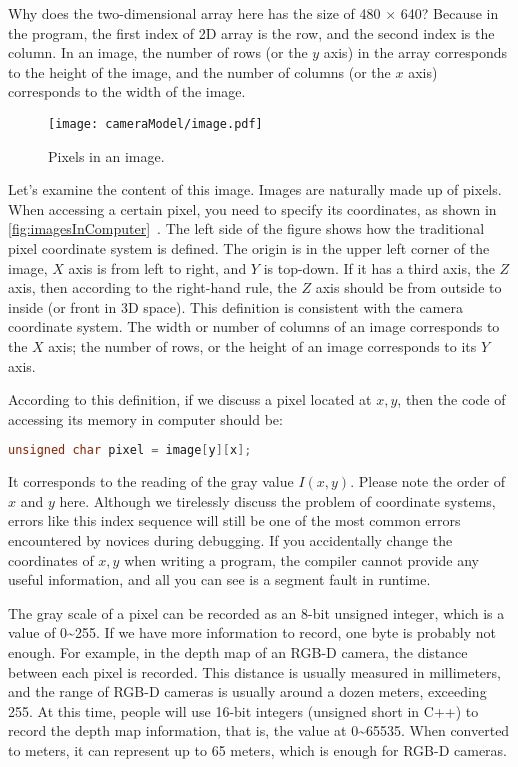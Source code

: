 Why does the two-dimensional array here has the size of 480 $ \times $ 640? Because in the program, the first index of 2D array is the row, and the second index is the column. In an image, the number of rows (or the $y$ axis) in the array corresponds to the height of the image, and the number of columns (or the $x$ axis) corresponds to the width of the image.
\begin{figure}[!t]
    \centering
    \texttt{[image: cameraModel/image.pdf]}
    \caption{Pixels in an image.}
    \label{fig:imagesInComputer}
\end{figure}

Let's examine the content of this image. Images are naturally made up of pixels. When accessing a certain pixel, you need to specify its coordinates, as shown in \autoref{fig:imagesInComputer}~. The left side of the figure shows how the traditional pixel coordinate system is defined. The origin is in the upper left corner of the image, $X$ axis is from left to right, and $Y$ is top-down. If it has a third axis, the $ Z $ axis, then according to the right-hand rule, the $ Z $ axis should be from outside to inside (or front in 3D space). This definition is consistent with the camera coordinate system. The width or number of columns of an image corresponds to the $ X $ axis; the number of rows, or the height of an image corresponds to its $ Y $ axis.

According to this definition, if we discuss a pixel located at $x,y$, then the code of accessing its memory in computer should be:
\begin{lstlisting}[language = C++, caption = Accessing image pixels]
unsigned char pixel = image[y][x];
\end{lstlisting}

It corresponds to the reading of the gray value $ I(x,y) $. Please note the order of $ x $ and $ y $ here. Although we tirelessly discuss the problem of coordinate systems, errors like this index sequence will still be one of the most common errors encountered by novices during debugging. If you accidentally change the coordinates of $ x, y $ when writing a program, the compiler cannot provide any useful information, and all you can see is a segment fault in runtime.

The gray scale of a pixel can be recorded as an 8-bit unsigned integer, which is a value of 0\textasciitilde 255. If we have more information to record, one byte is probably not enough. For example, in the depth map of an RGB-D camera, the distance between each pixel is recorded. This distance is usually measured in millimeters, and the range of RGB-D cameras is usually around a dozen meters, exceeding 255. At this time, people will use 16-bit integers (unsigned short in C++) to record the depth map information, that is, the value at 0\textasciitilde 65535. When converted to meters, it can represent up to 65 meters, which is enough for RGB-D cameras.

